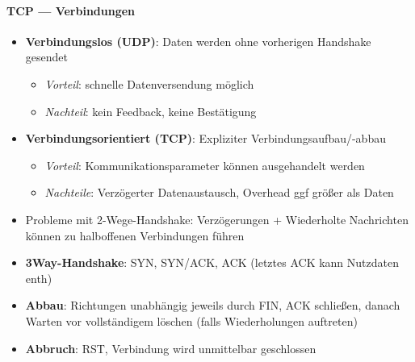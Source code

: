 \paragraph{TCP --- Verbindungen}
\begin{itemize}
  \item \textbf{Verbindungslos (UDP)}: Daten werden ohne vorherigen Handshake gesendet
  \begin{itemize}
    \item \emph{Vorteil}: schnelle Datenversendung möglich
    \item \emph{Nachteil}: kein Feedback, keine Bestätigung
  \end{itemize}
  \item \textbf{Verbindungsorientiert (TCP)}: Expliziter Verbindungsaufbau/-abbau
  \begin{itemize}
    \item \emph{Vorteil}: Kommunikationsparameter können ausgehandelt werden
    \item \emph{Nachteile}: Verzögerter Datenaustausch, Overhead ggf größer als Daten
  \end{itemize}
  \item Probleme mit 2-Wege-Handshake: Verzögerungen + Wiederholte Nachrichten können zu halboffenen Verbindungen führen
  \item \textbf{3Way-Handshake}: SYN, SYN/ACK, ACK (letztes ACK kann Nutzdaten enth)
  \item \textbf{Abbau}: Richtungen unabhängig jeweils durch FIN, ACK schließen, danach Warten vor vollständigem löschen (falls Wiederholungen auftreten)
  \item \textbf{Abbruch}: RST, Verbindung wird unmittelbar geschlossen
\end{itemize}


